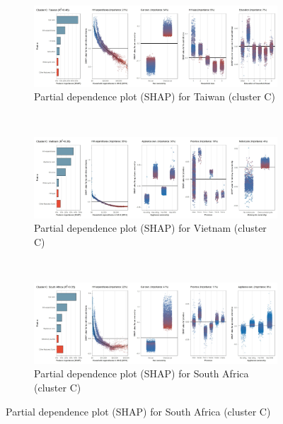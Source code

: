 \begin{figure}[ht!]\ContinuedFloat
    \centering
   \begin{subfigure}[b]{\textwidth}
   \centering
         \caption{Partial dependence plot (SHAP) for Taiwan (cluster C)}
         \label{fig:5b_TWN}
         \includegraphics[width=\textwidth]{Figure 5b/Figure_5b_TWN}    
   \end{subfigure}
    \\
    \vspace{0.5cm}
   \begin{subfigure}[b]{\textwidth} 
   \centering
         \caption{Partial dependence plot (SHAP) for Vietnam (cluster C)}
         \label{fig:5b_VNM}
         \includegraphics[width=\textwidth]{Figure 5b/Figure_5b_VNM}    
   \end{subfigure}
    \\
    \vspace{0.5cm}
   \begin{subfigure}[b]{\textwidth}  
   \centering
         \caption{Partial dependence plot (SHAP) for South Africa (cluster C)}
         \label{fig:5b_ZAF}
         \includegraphics[width=\textwidth]{Figure 5b/Figure_5b_ZAF}    
    \end{subfigure}

\end{figure}
